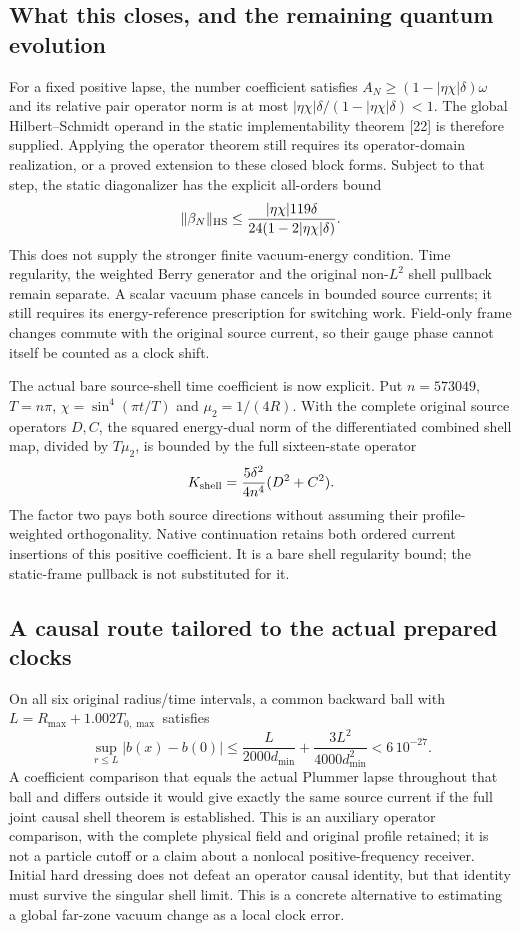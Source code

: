\subsection{What this closes, and the remaining quantum evolution}
For a fixed positive lapse, the number coefficient satisfies
$A_N\ge(1-|\eta\chi|\delta)\omega$ and its relative pair operator norm is
at most $|\eta\chi|\delta/(1-|\eta\chi|\delta)<1$.
The global Hilbert--Schmidt operand in the static implementability theorem [22]
is therefore supplied.  Applying the operator theorem still requires its
operator-domain realization, or a proved extension to these closed block
forms.  Subject to that step, the static diagonalizer has the explicit
all-orders bound
\[
 \|\beta_N\|_{\rm HS}
 \le\frac{|\eta\chi|119\delta}{24(1-2|\eta\chi|\delta)}.
\]
This does not supply the stronger finite vacuum-energy condition.
Time regularity, the weighted Berry generator and the original non-$L^2$
shell pullback remain separate.  A scalar vacuum phase cancels in bounded
source currents; it still requires its energy-reference prescription for
switching work.  Field-only frame changes commute with the original source
current, so their gauge phase cannot itself be counted as a clock shift.

The actual bare source-shell time coefficient is now explicit.  Put
$n=573049$, $T=n\pi$, $\chi=\sin^4(\pi t/T)$ and
$\mu_2=1/(4R)$.  With the complete original source operators $D,C$, the
squared energy-dual norm of the differentiated combined shell map, divided
by $T\mu_2$, is bounded by the full sixteen-state operator
\[
 K_{\rm shell}=\frac{5\delta^2}{4n^4}(D^2+C^2).
\]
The factor two pays both source directions without assuming their
profile-weighted orthogonality.  Native continuation retains both ordered
current insertions of this positive coefficient.  It is a bare shell
regularity bound; the static-frame pullback is not substituted for it.

\subsection{A causal route tailored to the actual prepared clocks}
On all six original radius/time intervals, a common backward ball with
$L=R_{\max}+1.002T_{0,\max}$ satisfies
\[
 \sup_{r\le L}|b(x)-b(0)|
 \le\frac{L}{2000d_{\min}}+
      \frac{3L^2}{4000d_{\min}^2}
 <6\,10^{-27}.
\]
A coefficient comparison that equals the actual Plummer lapse throughout
that ball and differs outside it would give exactly the same source current
if the full joint causal shell theorem is established.  This is an auxiliary
operator comparison, with the complete physical field and original profile
retained; it is not a particle cutoff or a claim about a nonlocal
positive-frequency receiver.  Initial hard dressing does not defeat an
operator causal identity, but that identity must survive the singular shell
limit.  This is a concrete alternative to estimating a global far-zone
vacuum change as a local clock error.

